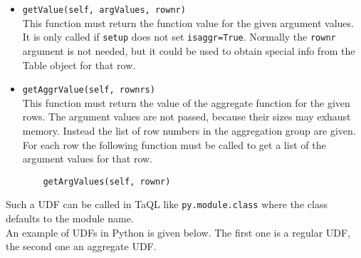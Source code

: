 \begin{itemize}
 \item \texttt{getValue(self, argValues, rownr)}\\
  This function must return the function value for the given argument
  values. It is only called if \texttt{setup} does not set \texttt{isaggr=True}.
  Normally the \texttt{rownr} argument is not needed, but it could be
  used to obtain special info from the Table object for that row.
 \item \texttt{getAggrValue(self, rownrs)}\\
  This function must return the value of the aggregate function for the given rows.
  The argument values are not passed, because their sizes may exhaust
  memory. Instead the list of row numbers in the aggregation group
  are given. For each row the following function must be called to
  get a list of the argument values for that row.
\begin{verbatim}
    getArgValues(self, rownr)
\end{verbatim}

\end{itemize}
Such a UDF can be called in TaQL like \texttt{py.module.class} where
the class defaults to the module name.
\\An example of UDFs in Python is given below. The first one is a
regular UDF, the second one an aggregate UDF.

